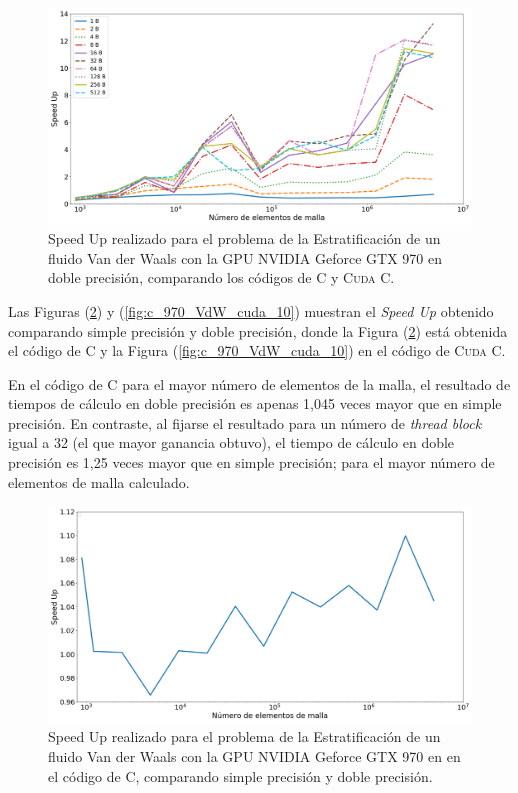\begin{figure}[htbp]
	\centering
	\includegraphics[width=\textwidth]{figs/cap4/s_970_VdW_double_10}
	\caption{Speed Up realizado para el problema de la Estratificación de un fluido Van der Waals con la GPU NVIDIA Geforce GTX 970 en doble precisión, comparando los códigos de \textsc{C} y \textsc{Cuda C}.} 
	\label{fig:s_970_VdW_double_10}	
\end{figure}

\newpage

Las Figuras (\ref{fig:c_970_VdW_c_10}) y (\ref{fig:c_970_VdW_cuda_10}) muestran el \textit{Speed Up} obtenido comparando simple precisión y doble precisión, donde la Figura (\ref{fig:c_970_VdW_c_10}) está obtenida el código de \textsc{C} y la Figura (\ref{fig:c_970_VdW_cuda_10}) en el código de \textsc{Cuda C}. 

En el código de \textsc{C} para el mayor número de elementos de la malla, el resultado de tiempos de cálculo en doble precisión es apenas 1,045 veces mayor que en  simple precisión. En contraste, al fijarse el resultado para un número de \textit{thread block} igual a 32 (el que mayor ganancia obtuvo), el tiempo de cálculo en doble precisión es 1,25 veces mayor que en simple precisión; para el mayor número de elementos de malla calculado.

\begin{figure}[htbp]
	\centering
	\includegraphics[width=\textwidth]{figs/cap4/c_970_VdW_c_10}
	\caption{Speed Up realizado para el problema de la Estratificación de un fluido Van der Waals con la GPU NVIDIA Geforce GTX 970 en en el código de \textsc{C}, comparando simple precisión y doble precisión.} 
	\label{fig:c_970_VdW_c_10}	
\end{figure}

